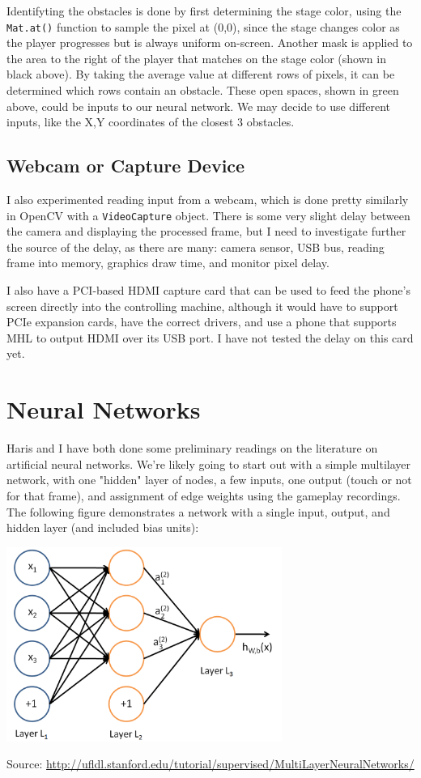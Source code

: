 \documentclass[a4paper,12pt]{article}
\begin{document}
Identifyting the obstacles is done by first determining the stage color, using
the \texttt{Mat.at()} function to sample the pixel at (0,0), since the
stage changes color as the player progresses but is always uniform on-screen.
Another mask is applied to the area to the right of the player that matches on
the stage color (shown in black above). By taking the average value at different
rows of pixels, it can be determined which rows contain an obstacle. These open
spaces, shown in green above, could be inputs to our neural network. We may
decide to use different inputs, like the X,Y coordinates of the closest 3
obstacles.

\subsection*{Webcam or Capture Device}

I also experimented reading input from a webcam, which is done pretty similarly
in OpenCV with a \texttt{VideoCapture} object. There is some very slight delay
between the camera and displaying the processed frame, but I need to
investigate further the source of the delay, as there are many: camera sensor,
USB bus, reading frame into memory, graphics draw time, and monitor pixel
delay.

I also have a PCI-based HDMI capture card that can be used to feed the phone's
screen directly into the controlling machine, although it would have to support
PCIe expansion cards, have the correct drivers, and use a phone that supports
MHL to output HDMI over its USB port. I have not tested the delay on this card
yet.

\section*{Neural Networks}

Haris and I have both done some preliminary readings on the literature on
artificial neural networks. We're likely going to start out with a simple
multilayer network, with one "hidden" layer of nodes, a few inputs, one output
(touch or not for that frame), and assignment of edge weights using the
gameplay recordings. The following figure demonstrates a network with a single
input, output, and hidden layer (and included bias units): \\

\centerline{\includegraphics[height=2.5in]{f2.png}}
{\footnotesize Source: 
\url{http://ufldl.stanford.edu/tutorial/supervised/MultiLayerNeuralNetworks/}}
\end{document}
